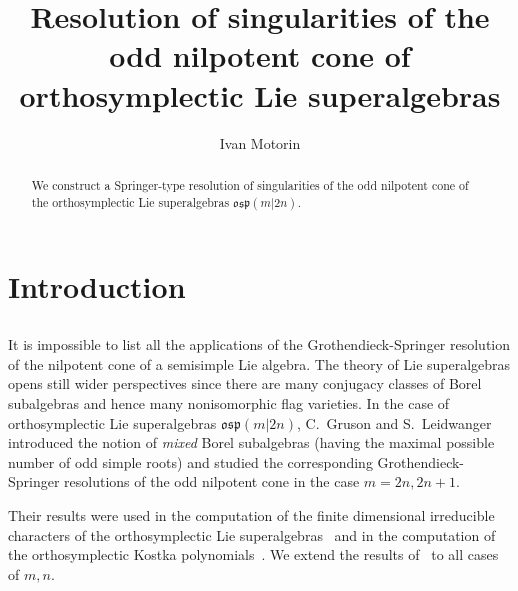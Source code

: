 \documentclass[12pt]{amsart}
\theoremstyle{definition}
\theoremstyle{remark}
\numberwithin{equation}{subsection}
\begin{document}
\author{Ivan Motorin}
\address{Skolkovo Institute of Science and Technology}
\title[Resolution of the odd nilpotent cone of some Lie superalgebras]
      {Resolution of singularities of the odd nilpotent cone of orthosymplectic Lie superalgebras}

\begin{abstract}
  We construct a Springer-type resolution of singularities of the odd nilpotent cone of the
  orthosymplectic Lie superalgebras $\mathfrak{osp}(m|2n)$.
\end{abstract}
\maketitle

\section{Introduction}

\subsection{}
It is impossible to list all the applications of the Grothendieck-Springer resolution of the
nilpotent cone of a semisimple Lie algebra. The theory of Lie superalgebras opens still wider
perspectives since there are many conjugacy classes of Borel subalgebras and hence many nonisomorphic
flag varieties. In the case of orthosymplectic Lie superalgebras $\mathfrak{osp}(m|2n)$,
C.~Gruson and S.~Leidwanger~\cite{GL} introduced the notion of {\em mixed} Borel subalgebras (having
the maximal possible number of odd simple roots) and studied the corresponding Grothendieck-Springer
resolutions of the odd nilpotent cone in the case $m=2n,2n+1$.

Their results were used in the computation of the finite dimensional irreducible characters of
the orthosymplectic Lie superalgebras~\cite{GL} and in the computation of the orthosymplectic
Kostka polynomials~\cite{BFT}. We extend the results of~\cite{GL} to all cases of $m,n$.
   
\end{document}
